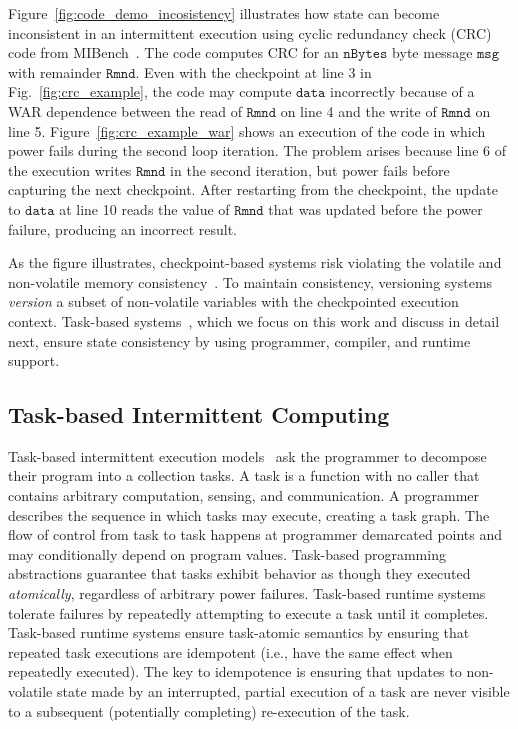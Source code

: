 Figure~\ref{fig:code_demo_incosistency} illustrates how state can become inconsistent in an intermittent execution using cyclic redundancy check (CRC) code from MIBench~\cite{hicks_mibench2_2016}. The code computes CRC for an $\texttt{nBytes}$ byte message $\texttt{msg}$ with remainder $\texttt{Rmnd}$. Even with the checkpoint at line 3 in Fig.~\ref{fig:crc_example}, the code may compute  $\texttt{data}$ incorrectly because of a WAR dependence between the read of $\texttt{Rmnd}$ on line 4 and the write of $\texttt{Rmnd}$ on line 5. Figure~\ref{fig:crc_example_war} shows an execution of the code in which power fails during the second loop iteration. The problem arises because line 6 of the execution writes $\texttt{Rmnd}$ in the second iteration, but power fails before capturing the next checkpoint. After restarting from the checkpoint, the update to $\texttt{data}$ at line 10 reads the value of $\texttt{Rmnd}$ that was updated before the power failure, producing an incorrect result.

As the figure illustrates, checkpoint-based systems risk violating the volatile and non-volatile memory consistency~\cite{dino}. To maintain consistency, versioning systems~\cite{dino,ratchet} {\em version} a subset of non-volatile variables with the checkpointed execution context. Task-based systems~\cite{chain,alpaca}, which we focus on this work and discuss in detail next, ensure state consistency by using programmer, compiler, and runtime support.

\subsection{Task-based Intermittent Computing}
\label{section:background_task_computing}

Task-based intermittent execution models~\cite{dino,chain,alpaca} ask the programmer to decompose their program into a collection tasks. A task is a function with no caller that contains arbitrary computation, sensing, and communication. A programmer describes the sequence in which tasks may execute, creating a task graph. The flow of control from task to task happens at programmer demarcated points and may conditionally depend on program values. Task-based programming abstractions guarantee that tasks exhibit behavior as though they executed {\em atomically}, regardless of arbitrary power failures. Task-based runtime systems tolerate failures by repeatedly attempting to execute a task until it completes. Task-based runtime systems ensure task-atomic semantics by ensuring that repeated task executions are idempotent (i.e., have the same effect when repeatedly executed). The key to idempotence is ensuring that updates to non-volatile state made by an interrupted, partial execution of a task are never visible to a subsequent (potentially completing) re-execution of the task.  

